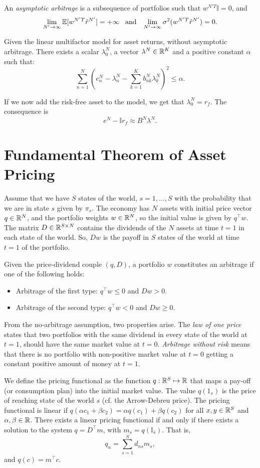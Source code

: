 \documentclass[twoside, titlepage]{article}
\begin{document}
An \textit{asymptotic arbitrage} is a subsequence of portfolios such that $w^{N'T}\mathbb{I} = 0$, and
\[
    \lim_{N' \to \infty} \mathbb{E}[w^{N'T}\tilde{r}^{N'}] = +\infty \;\;\; \text{and} \;\;\; \lim_{N' \to \infty} \sigma^2(w^{N'T}\tilde{r}^{N'}) = 0.
\]
\begin{proposition}
    Given the linear multifactor model for asset returns, without asymptotic arbitrage. There exists a scalar $\lambda^N_0$, a vector $\lambda^N \in \mathbb{R}^K$ and a positive constant $\alpha$ such that:
    \[
        \sum_{n=1}^{N}\left(e^N_n - \lambda^N_n - \sum_{k=1}^{K} b^N_{nk} \lambda^N_k\right)^2 \leq \alpha.
    \]
\end{proposition}
If we now add the risk-free asset to the model, we get that $\lambda^N_0 = r_f$. The consequence is
\[
    e^N - \mathbb{I}r_f \approx B^N \lambda^N.
\]


\section{Fundamental Theorem of Asset Pricing}

Assume that we have $S$ states of the world, $s = 1, \dots, S$ with the probability that we are in state $s$ given by $\pi_s$. The economy has $N$ assets with initial price vector $q \in \mathbb{R}^N$, and the portfolio weights $w \in \mathbb{R}^N$, so the initial value is given by $q^\top w$. The matrix $D \in \mathbb{R}^{S \times N}$ contains the dividends of the $N$ assets at time $t=1$ in each state of the world. So, $Dw$ is the payoff in $S$ states of the world at time $t=1$ of the portfolio.

Given the price-dividend couple $(q, D)$, a portfolio $w$ constitutes an arbitrage if one of the following holds:
\begin{itemize}
    \item Arbitrage of the first type: $q^\top w \leq 0$ and $Dw > 0$.
    \item Arbitrage of the second type: $q^\top w < 0$ and $Dw \geq 0$.
\end{itemize}
From the no-arbitrage assumption, two properties arise. The \textit{law of one price} states that two portfolios with the same dividend in every state of the world at $t=1$, should have the same market value at $t=0$. \textit{Arbitrage without risk} means that there is no portfolio with non-positive market value at $t=0$ getting a constant positive amount of money at $t=1$.

We define the pricing functional as the function $q : \mathbb{R}^S \mapsto \mathbb{R}$ that maps a pay-off (or consumption plan) into the initial market value. The value $q(1_s)$ is the price of reaching state  of the world $s$ (cf. the Arrow-Debreu price). The pricing functional is linear if $q(\alpha c_1 + \beta c_2) = \alpha q(c_1) + \beta q(c_2)$ for all $x, y \in \mathbb{R}^S$ and $\alpha, \beta \in \mathbb{R}$. There exists a linear pricing functional if and only if there exists a solution to the system $q = D^\top m$, with $m_s = q(\mathbb{I}_s)$. That is,
\[
    q_n = \sum_{s=1}^{S}d_{ns}m_s,
\]
and $q(c) = m^\top c$.
\end{document}
